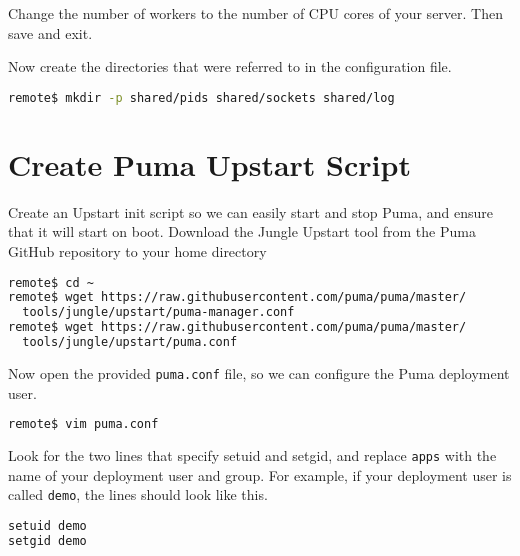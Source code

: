 Change the number of workers to the number of CPU cores of your server.
Then save and exit.

Now create the directories that were referred to in the configuration file.

\begin{minipage}{\linewidth}
\begin{lstlisting}[language=bash]
remote$ mkdir -p shared/pids shared/sockets shared/log
\end{lstlisting}
\end{minipage}

\section{Create Puma Upstart Script}

Create an Upstart init script so we can easily start and stop Puma,
and ensure that it will start on boot.
Download the Jungle Upstart tool from the Puma GitHub repository
to your home directory

\begin{minipage}{\linewidth}
\begin{lstlisting}[language=bash]
remote$ cd ~
remote$ wget https://raw.githubusercontent.com/puma/puma/master/
  tools/jungle/upstart/puma-manager.conf
remote$ wget https://raw.githubusercontent.com/puma/puma/master/
  tools/jungle/upstart/puma.conf
\end{lstlisting}
\end{minipage}

Now open the provided \texttt{puma.conf} file,
so we can configure the Puma deployment user.

\begin{minipage}{\linewidth}
\begin{lstlisting}[language=bash]
remote$ vim puma.conf
\end{lstlisting}
\end{minipage}

Look for the two lines that specify setuid and setgid, and replace \texttt{apps}
with the name of your deployment user and group. For example,
if your deployment user is called \texttt{demo}, the lines should look like this.

\begin{minipage}{\linewidth}
  \begin{lstlisting}[language=bash, caption={puma.conf}]
setuid demo
setgid demo
\end{lstlisting}
\end{minipage}

